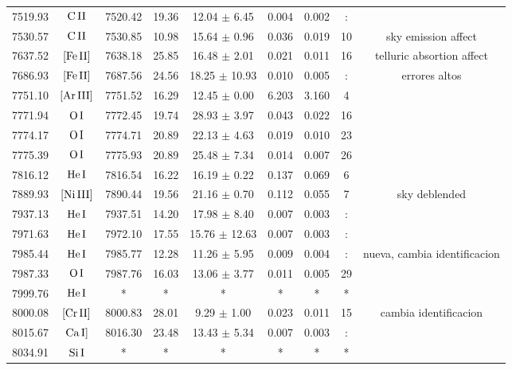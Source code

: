 \documentclass{article}
\begin{document}
\begin{table*}
\begin{adjustbox}{width=\textwidth}
\begin{tabular}{ccccccccc}
7519.93 & $\mbox{C}\thinspace \mbox{II}$ & 7520.42 & 19.36 & 12.04 $\pm$ 6.45 & 0.004 & 0.002 & : &  \\
7530.57 & $\mbox{C}\thinspace \mbox{II}$ & 7530.85 & 10.98 & 15.64 $\pm$ 0.96 & 0.036 & 0.019 & 10 &  sky emission affect \\
7637.52 & $\mbox{[Fe}\thinspace \mbox{II]}$ & 7638.18 & 25.85 & 16.48 $\pm$ 2.01 & 0.021 & 0.011 & 16 &  telluric absortion affect \\
7686.93 & $\mbox{[Fe}\thinspace \mbox{II]}$ & 7687.56 & 24.56 & 18.25 $\pm$ 10.93 & 0.010 & 0.005 & : &  errores altos \\
7751.10 & $\mbox{[Ar}\thinspace \mbox{III]}$ & 7751.52 & 16.29 & 12.45 $\pm$ 0.00 & 6.203 & 3.160 & 4 &  \\
7771.94 & $\mbox{O}\thinspace \mbox{I}$ & 7772.45 & 19.74 & 28.93 $\pm$ 3.97 & 0.043 & 0.022 & 16 &   \\
7774.17 & $\mbox{O}\thinspace \mbox{I}$ & 7774.71 & 20.89 & 22.13 $\pm$ 4.63 & 0.019 & 0.010 & 23 & \\
7775.39 & $\mbox{O}\thinspace \mbox{I}$ & 7775.93 & 20.89 & 25.48 $\pm$ 7.34 & 0.014 & 0.007 & 26 &   \\
7816.12 & $\mbox{He}\thinspace \mbox{I}$ & 7816.54 & 16.22 & 16.19 $\pm$ 0.22 & 0.137 & 0.069 & 6 &  \\
7889.93 & $\mbox{[Ni}\thinspace \mbox{III]}$ & 7890.44 & 19.56 & 21.16 $\pm$ 0.70 & 0.112 & 0.055 & 7 &  sky deblended \\
7937.13 & $\mbox{He}\thinspace \mbox{I}$ & 7937.51 & 14.20 & 17.98 $\pm$ 8.40 & 0.007 & 0.003 & : &  \\
7971.63 & $\mbox{He}\thinspace \mbox{I}$ & 7972.10 & 17.55 & 15.76 $\pm$ 12.63 & 0.007 & 0.003 & : &  \\
7985.44 & $\mbox{He}\thinspace \mbox{I}$ & 7985.77 & 12.28 & 11.26 $\pm$ 5.95 & 0.009 & 0.004 & : &  nueva, cambia identificacion \\
7987.33 & $\mbox{O}\thinspace \mbox{I}$ & 7987.76 & 16.03 & 13.06 $\pm$ 3.77 & 0.011 & 0.005 & 29 &  \\
7999.76 & $\mbox{He}\thinspace \mbox{I}$ & * & * & * & * & * & * &  \\
8000.08 & $\mbox{[Cr}\thinspace \mbox{II]}$ & 8000.83 & 28.01 & 9.29 $\pm$ 1.00 & 0.023 & 0.011 & 15 &  cambia identificacion \\
8015.67 & $\mbox{Ca}\thinspace \mbox{I]}$ & 8016.30 & 23.48 & 13.43 $\pm$ 5.34 & 0.007 & 0.003 & : &  \\
8034.91 & $\mbox{Si}\thinspace \mbox{I}$ & * & * & * & * & * & * &  \\

\end{tabular}
\end{adjustbox}
\end{table*}
\end{document}
